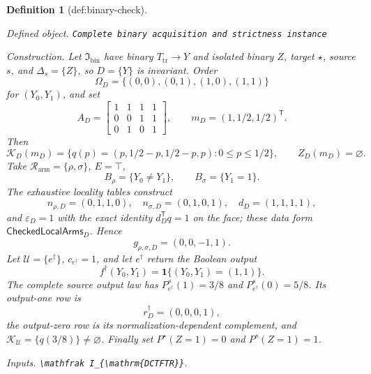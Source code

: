 \documentclass{article}
\newtheorem{definition}{Definition}
\begin{document}
\begin{definition}[def:binary-check]\label{def:binary-check}
\par\smallskip\noindent\emph{Defined object.} \texttt{Complete binary acquisition and strictness instance}
\par\smallskip\noindent\emph{Construction.} Let \(\mathfrak I_{\mathrm{bin}}\) have binary \(T_{\mathrm{tr}}\to Y\) and isolated binary \(Z\), target \(\star\), source \(s\), and \(\Delta_s=\{Z\}\), so \(D=\{Y\}\) is invariant.  Order
\[
\Omega_D=\{(0,0),(0,1),(1,0),(1,1)\}
\]
for \((Y_0,Y_1)\), and set
\[
A_D=\begin{bmatrix}
1&1&1&1\\0&0&1&1\\0&1&0&1
\end{bmatrix},
\qquad m_D=(1,1/2,1/2)^{\mathsf T}.
\]
Then
\[
\mathcal K_D(m_D)=
\{q(p)=(p,1/2-p,1/2-p,p):0\leq p\leq1/2\},
\qquad Z_D(m_D)=\varnothing.
\]
Take \(\mathcal R_{\mathrm{arm}}=\{\rho,\sigma\}\), \(E=\top\),
\[
B_\rho=\{Y_0\ne Y_1\},
\qquad B_\sigma=\{Y_1=1\}.
\]
The exhaustive locality tables construct
\[
n_{\rho,D}=(0,1,1,0),\quad
n_{\sigma,D}=(0,1,0,1),\quad
d_D=(1,1,1,1),
\]
and \(\varepsilon_D=1\) with the exact identity \(d_D^{\mathsf T}q=1\) on the face; these data form \(\mathsf{CheckedLocalArms}_D\).  Hence
\[
g_{\rho,\sigma,D}=(0,0,-1,1).
\]
Let \(\mathcal U=\{e^\dagger\}\), \(c_{e^\dagger}=1\), and let \(e^\dagger\) return the Boolean output
\[
f^\dagger(Y_0,Y_1)=\mathbf 1\{(Y_0,Y_1)=(1,1)\}.
\]
The complete source output law has \(P_{e^\dagger}^s(1)=3/8\) and \(P_{e^\dagger}^s(0)=5/8\).  Its output-one row is
\[
r_D^\dagger=(0,0,0,1),
\]
the output-zero row is its normalization-dependent complement, and \(\mathcal K_{\mathcal U}=\{q(3/8)\}\ne\varnothing\).  Finally set \(P^\star(Z=1)=0\) and \(P^s(Z=1)=1\).
\par\smallskip\noindent\emph{Inputs.} \texttt{\textbackslash{}\allowbreak{}mathfrak I\_\allowbreak{}\{\textbackslash{}\allowbreak{}mathrm\{DCTFTR\}\allowbreak{}\}\allowbreak{}}.
\end{definition}
\end{document}
